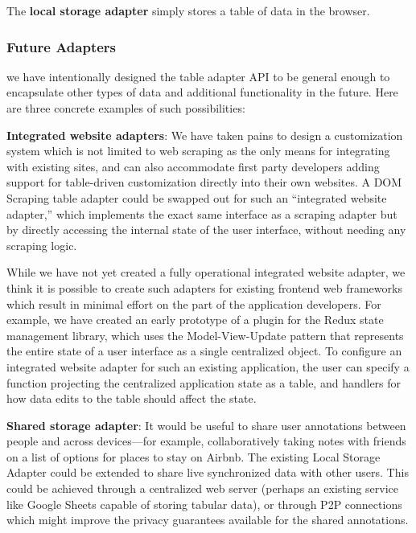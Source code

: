 \documentclass[sigplan,10pt,anonymous,review]{acmart}
\begin{document}
The \textbf{local storage adapter} simply stores a table of data in the
browser.

\hypertarget{future-adapters}{%
\subsubsection{Future Adapters}\label{future-adapters}}

we have intentionally designed the table adapter API to be general
enough to encapsulate other types of data and additional functionality
in the future. Here are three concrete examples of such possibilities:

\textbf{Integrated website adapters}: We have taken pains to design a
customization system which is not limited to web scraping as the only
means for integrating with existing sites, and can also accommodate
first party developers adding support for table-driven customization
directly into their own websites. A DOM Scraping table adapter could be
swapped out for such an ``integrated website adapter,'' which implements
the exact same interface as a scraping adapter but by directly accessing
the internal state of the user interface, without needing any scraping
logic.

While we have not yet created a fully operational integrated website
adapter, we think it is possible to create such adapters for existing
frontend web frameworks which result in minimal effort on the part of
the application developers. For example, we have created an early
prototype of a plugin for the Redux state management library, which uses
the Model-View-Update pattern that represents the entire state of a user
interface as a single centralized object. To configure an integrated
website adapter for such an existing application, the user can specify a
function projecting the centralized application state as a table, and
handlers for how data edits to the table should affect the state.

\textbf{Shared storage adapter}: It would be useful to share user
annotations between people and across devices---for example,
collaboratively taking notes with friends on a list of options for
places to stay on Airbnb. The existing Local Storage Adapter could be
extended to share live synchronized data with other users. This could be
achieved through a centralized web server (perhaps an existing service
like Google Sheets capable of storing tabular data), or through P2P
connections which might improve the privacy guarantees available for the
shared annotations.
\end{document}
